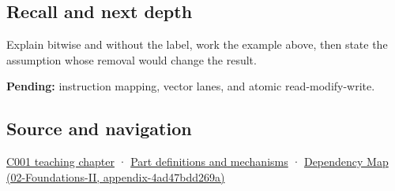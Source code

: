 \subsection{Recall and next depth}\label{appendix-68b52453737c-recall-and-next-depth}

Explain bitwise and without the label, work the example above, then state the assumption whose removal would change the result.

\textbf{Pending:} instruction mapping, vector lanes, and atomic read-modify-write.

\subsection{Source and navigation}\label{appendix-68b52453737c-source-and-navigation}

\hyperref[01-foundations-i-ch001-from-a-signal-to-an-interpretation]{C001 teaching chapter} · \hyperref[appendix-fd090d982a15]{Part definitions and mechanisms} · \href{../02-Foundations-II/main.pdf\#nameddest=appendix-4ad47bdd269a}{Dependency Map (02-Foundations-II, appendix-4ad47bdd269a)}
